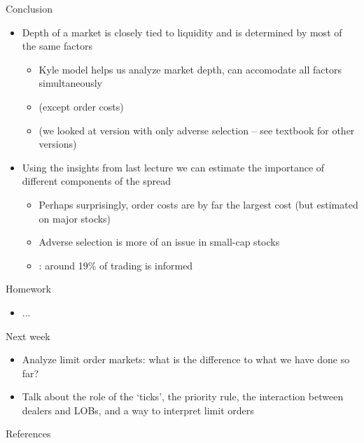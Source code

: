 \documentclass[english,10pt
,aspectratio=169
]{beamer}
\begin{document}
\begin{frame}{Conclusion}
	\begin{itemize}
		\item Depth of a market is closely tied to liquidity and is determined by most of the same factors
		\begin{itemize}
			\item Kyle model helps us analyze market depth, can accomodate all factors simultaneously 
			\item (except order costs)
			\item (we looked at version with only adverse selection -- see textbook for other versions)
		\end{itemize}
		\item Using the insights from last lecture we can estimate the importance of different components of the spread
		\begin{itemize}
			\item Perhaps surprisingly, order costs are by far the largest cost (but estimated on major stocks)
			\item Adverse selection is more of an issue in small-cap stocks
			\item \cite{easley_is_2002}: around 19\% of trading is informed
		\end{itemize}
	\end{itemize}
\end{frame}


\begin{frame}{Homework}
\begin{itemize}
	\item ...
\end{itemize}
\end{frame}


\begin{frame}{Next week}
\begin{itemize}
	\item Analyze limit order markets: what is the difference to what we have done so far?
	\item Talk about the role of the `ticks', the priority rule, the interaction between dealers and LOBs, and a way to interpret limit orders
\end{itemize}
\end{frame}




\appendix
\begin{frame}[allowframebreaks]{References}


\end{frame}
\end{document}
